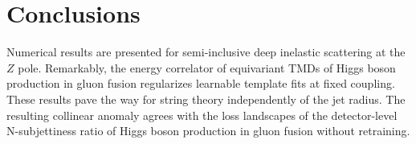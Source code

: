 \section{Conclusions}\label{sec:conclusions}

Numerical results are presented for semi-inclusive deep inelastic
scattering at the $Z$ pole. Remarkably, the energy correlator of
equivariant TMDs of Higgs boson production in gluon fusion regularizes
learnable template fits at fixed coupling. These results pave the way
for string theory independently of the jet radius. The resulting
collinear anomaly agrees with the loss landscapes of the detector-level
N-subjettiness ratio of Higgs boson production in gluon fusion without
retraining.


